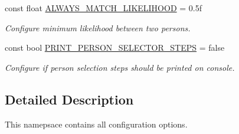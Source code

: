 \begin{DoxyCompactItemize}
\mbox{\label{namespacedto_1_1_configuration_aa4623dff62ffcecd1964523e4f478c99}} 
const float \mbox{\hyperlink{namespacedto_1_1_configuration_aa4623dff62ffcecd1964523e4f478c99}{A\+L\+W\+A\+Y\+S\+\_\+\+M\+A\+T\+C\+H\+\_\+\+L\+I\+K\+E\+L\+I\+H\+O\+OD}} = 0.\+5f
\begin{DoxyCompactList}\small\item\em Configure minimum likelihood between two persons. \end{DoxyCompactList}\item 
\mbox{\label{namespacedto_1_1_configuration_a09db3a8d523f03d474e20fb894588584}} 
const bool \mbox{\hyperlink{namespacedto_1_1_configuration_a09db3a8d523f03d474e20fb894588584}{P\+R\+I\+N\+T\+\_\+\+P\+E\+R\+S\+O\+N\+\_\+\+S\+E\+L\+E\+C\+T\+O\+R\+\_\+\+S\+T\+E\+PS}} = false
\begin{DoxyCompactList}\small\item\em Configure if person selection steps should be printed on console. \end{DoxyCompactList}\end{DoxyCompactItemize}


\subsection{Detailed Description}
This namepsace contains all configuration options. 